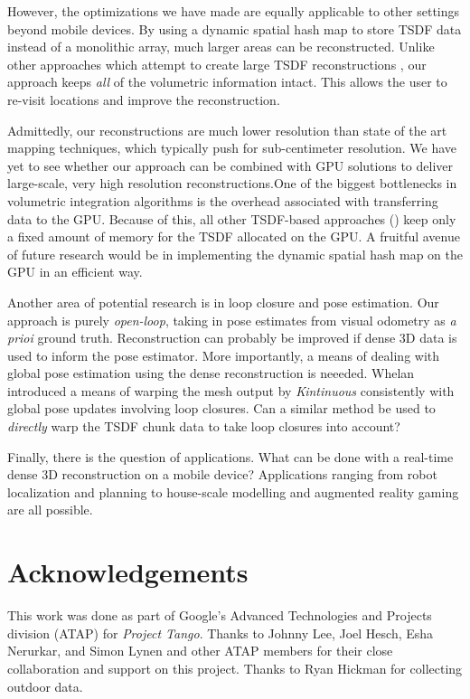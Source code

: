 \documentclass[10pt,twocolumn,letterpaper]{article}
\begin{document}
However, the optimizations we have made are equally applicable to other
settings beyond mobile devices. By using a dynamic spatial hash map to store
TSDF data instead of a monolithic array, much larger areas can be
reconstructed. Unlike other approaches which attempt to create large TSDF
reconstructions \cite{Whelan2013}, our approach keeps \textit{all} of the
volumetric information intact. This allows the user to re-visit locations and
improve the reconstruction.

Admittedly, our reconstructions are much lower resolution than state of the art
mapping techniques, which typically push for sub-centimeter resolution. We have
yet to see whether our approach can be combined with GPU solutions to deliver
large-scale, very high resolution reconstructions.One of the biggest
bottlenecks in volumetric integration algorithms is the overhead associated
with transferring data to the GPU. Because of this, all other TSDF-based
approaches (\cite{Newcombe, Whelan2013, Bylow2013, Nguyen2012}) keep only a
fixed amount of memory for the TSDF allocated on the GPU. A fruitful avenue of
future research would be in implementing the dynamic spatial hash map on the GPU
in an efficient way. 

Another area of potential research is in loop closure and pose estimation. Our
approach is purely \textit{open-loop}, taking in pose estimates from visual
odometry as \textit{a prioi} ground truth. Reconstruction can probably be
improved if dense 3D data is used to inform the pose estimator. More
importantly, a means of dealing with global pose estimation using the dense
reconstruction is neeeded. Whelan \etal\cite{WhelanLoopClose} introduced a
means of warping the mesh output by \textit{Kintinuous} consistently with global
pose updates involving loop closures. Can a similar method be used to
\textit{directly} warp the TSDF chunk data to take loop closures into account?

Finally, there is the question of applications. What can be done with a
real-time dense 3D reconstruction on a mobile device? Applications ranging from
robot localization and planning to house-scale modelling and augmented reality
gaming are all possible.

\ifcvprfinal
\section*{Acknowledgements}
This work was done as part of Google's Advanced Technologies and Projects
division (ATAP) for \emph{Project Tango}. Thanks to Johnny Lee, Joel Hesch, Esha
Nerurkar, and Simon Lynen and other ATAP members for their close collaboration
and support on this project. Thanks to Ryan Hickman for collecting outdoor data.
\fi


 
\end{document}
